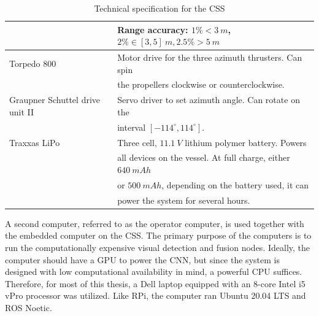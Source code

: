 \begin{table}[H]
\begin{tabular*}{\linewidth}{ll}
    & \textbf{Range accuracy:} $1\%<\SI{3}{m}$, $2\% \in [3, 5] \ m, 2.5\% > \SI{5}{m}$ \\
    \hline
    Torpedo 800 & Motor drive for the three azimuth thrusters. Can spin \\ & the propellers clockwise or counterclockwise. \\
    \hline
    Graupner Schuttel drive unit II & Servo driver to set azimuth angle. Can rotate on the \\ & interval $[-114^\circ, 114^\circ]$. \\
     \hline
    Traxxas LiPo & Three cell, $\SI{11.1}{V}$ lithium polymer battery. Powers \\ 
    & all devices on the vessel. At full charge, either $\SI{640}{mAh}$ \\ & or $\SI{500}{mAh}$, depending on the battery used, it can \\ & power the system for several hours. \\
    \bottomrule
    \end{tabular*}
    \caption{Technical specification for the CSS}
    \label{tab:techspec}
\end{table}

A second computer, referred to as the operator computer, is used together with the embedded computer on the CSS. The primary purpose of the computers is to run the computationally expensive visual detection and fusion nodes. Ideally, the computer should have a GPU to power the CNN, but since the system is designed with low computational availability in mind, a powerful CPU suffices. Therefore, for most of this thesis, a Dell laptop equipped with an 8-core Intel i5 vPro processor was utilized. Like RPi, the computer ran Ubuntu 20.04 LTS and ROS Noetic. 



